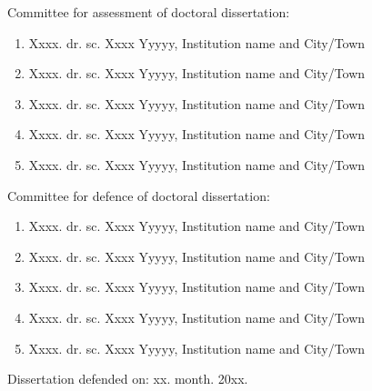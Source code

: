 \documentclass[12pt, twoside, onecolumn]{book}
\DeclareRobustCommand{\[}{\begin{equation}}
\DeclareRobustCommand{\]}{\end{equation}}
\begin{document}
\begin{titlepage}
\begin{flushleft}
\newpage
\textnormal{}
\vskip 30mm
Committee for assessment of doctoral dissertation:

\begin{enumerate}
\item Xxxx. dr. sc. Xxxx Yyyyy, Institution name and City/Town
\item Xxxx. dr. sc. Xxxx Yyyyy, Institution name and City/Town
\item Xxxx. dr. sc. Xxxx Yyyyy, Institution name and City/Town
\item Xxxx. dr. sc. Xxxx Yyyyy, Institution name and City/Town
\item Xxxx. dr. sc. Xxxx Yyyyy, Institution name and City/Town
\end{enumerate}

\vskip 15mm
Committee for defence of doctoral dissertation:

\begin{enumerate}
\item Xxxx. dr. sc. Xxxx Yyyyy, Institution name and City/Town
\item Xxxx. dr. sc. Xxxx Yyyyy, Institution name and City/Town
\item Xxxx. dr. sc. Xxxx Yyyyy, Institution name and City/Town
\item Xxxx. dr. sc. Xxxx Yyyyy, Institution name and City/Town
\item Xxxx. dr. sc. Xxxx Yyyyy, Institution name and City/Town
\end{enumerate}
\vskip 15mm
Dissertation defended on: xx. month. 20xx.

\end{flushleft}





\newpage
\thispagestyle{empty}
\textnormal{}  %


\end{titlepage}

\tableofcontents
\setcounter{tocdepth}{2}
\setcounter{secnumdepth}{2}
\end{document}
